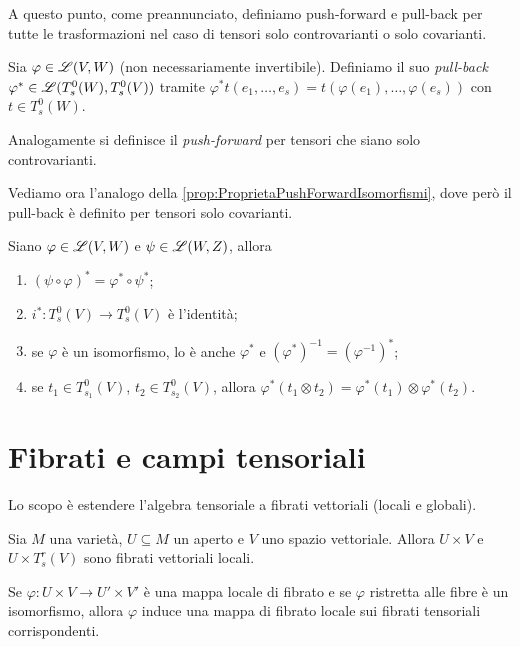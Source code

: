 A questo punto, come preannunciato, definiamo push-forward e pull-back per tutte le trasformazioni nel caso di tensori solo controvarianti o solo covarianti.

\begin{definition}  
	Sia $\varphi\in \mathscr L(V,W)$ (non necessariamente invertibile). Definiamo il suo \emph{pull-back} $\varphi^*\in \mathscr L(T_s^0(W),T_s^0(V))$ tramite $\varphi^*t(e_1,\ldots,e_s) = t(\varphi(e_1),\ldots,\varphi(e_s))$ con $t\in T_s^0(W)$.
	
	Analogamente si definisce il \emph{push-forward} per tensori che siano solo controvarianti.
\end{definition}

Vediamo ora l'analogo della \cref{prop:ProprietaPushForwardIsomorfismi}, dove però il pull-back è definito per tensori solo covarianti. %

\begin{proposition}
	Siano $\varphi\in \mathscr L(V,W)$ e $\psi\in \mathscr L(W,Z)$, allora
	\begin{enumerate}
		\item $(\psi\circ\varphi)^*=\varphi^*\circ\psi^*$;
		\item $i^*:T_s^0(V) \to T_s^0(V)$ è l'identità;
		\item se $\varphi$ è un isomorfismo, lo è anche $\varphi^*$ e $(\varphi^*)^{-1} = (\varphi^{-1})^*$;
		\item se $t_1\in T_{s_1}^0(V)$, $t_2\in T_{s_2}^0(V)$, allora $\varphi^*(t_1\otimes t_2) = \varphi^*(t_1)\otimes \varphi^*(t_2)$.
	\end{enumerate}
\end{proposition}

\section{Fibrati e campi tensoriali}

Lo scopo è estendere l'algebra tensoriale a fibrati vettoriali (locali e globali).

Sia $M$ una varietà, $U\subseteq M$ un aperto e $V$ uno spazio vettoriale. Allora $U\times V$ e $U\times T_s^r(V)$ sono fibrati vettoriali locali.

Se $\varphi:U\times V \to U'\times V'$ è una mappa locale di fibrato e se $\varphi$ ristretta alle fibre è un isomorfismo, allora $\varphi$ induce una mappa di fibrato locale sui fibrati tensoriali corrispondenti.

